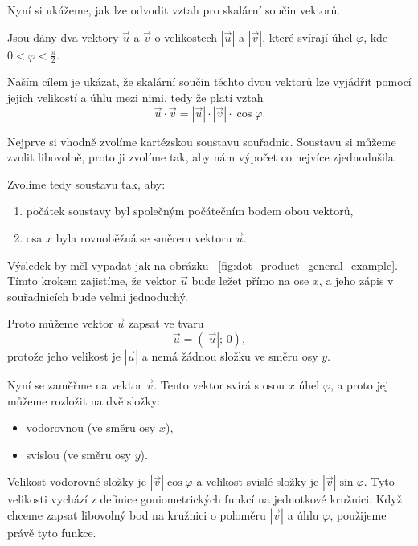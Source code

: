 Nyní si ukážeme, jak lze odvodit vztah pro skalární součin vektorů.

\begin{example}\label{exa:dot_product_general}
Jsou dány dva vektory $\vec{u}$ a $\vec{v}$ o velikostech $|\vec{u}|$ a $|\vec{v}|$,
které svírají úhel $\varphi$, kde $0 < \varphi < \frac{\pi}{2}$.

Naším cílem je ukázat, že skalární součin těchto dvou vektorů lze vyjádřit pomocí jejich velikostí a úhlu mezi nimi, tedy že platí vztah
\[
\vec{u} \cdot \vec{v} = |\vec{u}| \cdot |\vec{v}| \cdot \cos\varphi.
\]

Nejprve si vhodně zvolíme kartézskou soustavu souřadnic. Soustavu si můžeme zvolit libovolně, proto ji zvolíme tak, aby nám výpočet co nejvíce zjednodušila.

Zvolíme tedy soustavu tak, aby:
\begin{enumerate}
    \item počátek soustavy byl společným počátečním bodem obou vektorů,
    \item osa $x$ byla rovnoběžná se směrem vektoru $\vec{u}$.
\end{enumerate}

Výsledek by měl vypadat jak na obrázku ~\ref{fig:dot_product_general_example}.
Tímto krokem zajistíme, že vektor $\vec{u}$ bude ležet přímo na ose $x$, a jeho zápis v souřadnicích bude velmi jednoduchý.

Proto můžeme vektor $\vec{u}$ zapsat ve tvaru
\[
\vec{u} = (|\vec{u}|;\, 0),
\]
protože jeho velikost je $|\vec{u}|$ a nemá žádnou složku ve směru osy $y$.

Nyní se zaměřme na vektor $\vec{v}$. Tento vektor svírá s osou $x$ úhel $\varphi$, a proto jej můžeme rozložit na dvě složky:
\begin{itemize}
    \item vodorovnou (ve směru osy $x$),
    \item svislou (ve směru osy $y$).
\end{itemize}

Velikost vodorovné složky je $|\vec{v}|\cos\varphi$ a velikost svislé složky je $|\vec{v}|\sin\varphi$.
Tyto velikosti vychází z definice goniometrických funkcí na jednotkové kružnici.
Když chceme zapsat libovolný bod na kružnici o poloměru $|\vec{v}|$ a úhlu $\varphi$, použijeme právě tyto funkce.

















\end{example}
